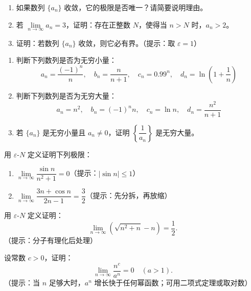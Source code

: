 \documentclass[fontset=fandol]{ctexart}
\begin{document}
\begin{exercise}
\begin{enumerate}
\item 如果数列 \(\{a_n\}\) 收敛，它的极限是否唯一？请简要说明理由。
\item 若 \(\lim\limits_{n\to\infty} a_n = 3\)，证明：存在正整数 \(N\)，使得当 \(n > N\) 时，\(a_n > 2\)。
\item 证明：若数列 \(\{a_n\}\) 收敛，则它必有界。（提示：取 \(\varepsilon = 1\)）
\end{enumerate}
\end{exercise}

\begin{exercise}
\begin{enumerate}
\item 判断下列数列是否为无穷小量：
   \[
   a_n = \dfrac{(-1)^n}{n},\quad b_n = \dfrac{n}{n+1},\quad c_n = 0.99^n,\quad d_n = \ln\left(1+\dfrac{1}{n}\right)
   \]
\item 判断下列数列是否为无穷大量：
   \[
   a_n = n^2,\quad b_n = (-1)^n n,\quad c_n = \ln n,\quad d_n = \dfrac{n^2}{n+1}
   \]
\item 若 \(\{a_n\}\) 是无穷小量且 \(a_n \neq 0\)，证明 \(\left\{\dfrac{1}{a_n}\right\}\) 是无穷大量。
\end{enumerate}
\end{exercise}

\begin{exercise}
用 \(\varepsilon\)-\(N\) 定义证明下列极限：
\begin{enumerate}
\item \(\lim\limits_{n\to\infty} \dfrac{\sin n}{n^2 + 1} = 0\)（提示：\(|\sin n| \leq 1\)）
\item \(\lim\limits_{n\to\infty} \dfrac{3n + \cos n}{2n - 1} = \dfrac{3}{2}\)（提示：先分拆，再放缩）
\end{enumerate}
\end{exercise}

\begin{exercise}
用 \(\varepsilon\)-\(N\) 定义证明：
\[
\lim_{n\to\infty} \left(\sqrt{n^2 + n} - n\right) = \dfrac{1}{2}.
\]
（提示：分子有理化后处理）
\end{exercise}

\begin{exercise}
设常数 \(c > 0\)，证明：
\[
\lim\limits_{n \to \infty} \dfrac{n^c}{a^n} = 0 \quad (a > 1).
\]
（提示：当 \(n\) 足够大时，\(a^n\) 增长快于任何幂函数；可用二项式定理或取对数）
\end{exercise}
\end{document}
